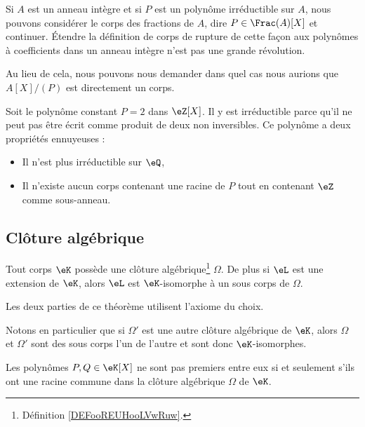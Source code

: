 Si \( A\) est un anneau intègre et si \( P\) est un polynôme irréductible sur \( A\), nous pouvons considérer le corps des fractions de \( A\), dire \( P\in\Frac(A)[X]\) et continuer. Étendre la définition de corps de rupture de cette façon aux polynômes à coefficients dans un anneau intègre n'est pas une grande révolution.

Au lieu de cela, nous pouvons nous demander dans quel cas nous aurions que \( A[X]/(P)\) est directement un corps.

\begin{example}
	Soit le polynôme constant \( P=2\) dans \( \eZ[X]\). Il y est irréductible parce qu'il ne peut pas être écrit comme produit de deux non inversibles. Ce polynôme a deux propriétés ennuyeuses :
	\begin{itemize}
		\item Il n'est plus irréductible sur \( \eQ\),
		\item Il n'existe aucun corps contenant une racine de \( P\) tout en contenant \( \eZ\) comme sous-anneau.
	\end{itemize}
\end{example}

\subsection{Clôture algébrique}

\begin{theorem}     \label{THOooQFWWooMWXEhT}
	Tout corps \( \eK\) possède une clôture algébrique\footnote{Définition \ref{DEFooREUHooLVwRuw}.} \( \Omega\). De plus si \( \eL\) est une extension de \( \eK\), alors \( \eL\) est \( \eK\)-isomorphe à un sous corps de \( \Omega\).
\end{theorem}
Les deux parties de ce théorème utilisent l'axiome du choix.

Notons en particulier que si \( \Omega'\) est une autre clôture algébrique de \( \eK\), alors \( \Omega\) et \( \Omega'\) sont des sous corps l'un de l'autre et sont donc \( \eK\)-isomorphes.

\begin{lemma}
	Les polynômes \( P,Q\in \eK[X]\) ne sont pas premiers entre eux si et seulement s'ils ont une racine commune dans la clôture algébrique \( \Omega\) de \( \eK\).
\end{lemma}

